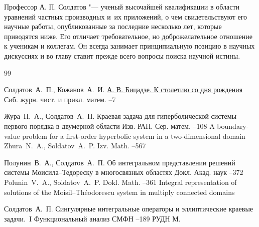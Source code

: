 Профессор А. П. Солдатов "--- ученый высочайшей квалификации в области уравнений частных производных и~их приложений, о чем свидетельствуют его научные работы, опубликованные за последние несколько лет, которые приводятся ниже. 
Его отличает требовательное, но доброжелательное отношение к ученикам и коллегам.
Он всегда занимает принципиальную позицию в научных дискуссиях и во главу ставит прежде всего вопросы поиска научной истины.




\newpage
\PersonRef

\begin{thebibliography}{99}

\by Солдатов~А.~П., Кожанов~А.~И.
\paper \href{http://mi.mathnet.ru/vngu441}{А. В. Бицадзе. К столетию со дня рождения}
\jour Сиб. журн. чист. и прикл. матем.
--7

\by Жура~Н.~А., Солдатов~А.~П.
\paper Краевая задача для гиперболической системы первого порядка в двумерной области
\jour Изв. РАН. Сер. матем.
--108
\transl
\paper A boundary-value problem for a first-order hyperbolic system in a two-dimensional domain
\by Zhura~N.~A.,  Soldatov~A.~P.
\jour Izv. Math.
--567


\by Полунин~В.~А., Солдатов~А.~П.
\paper Об интегральном представлении решений системы Моисила--Тедореску в многосвязных областях
\jour Докл. Акад. наук
–372
\transl
\by Polunin~V.~A.,  Soldatov~A.~P.
\jour Dokl. Math. 
–361 
\paper Integral representation of solutions of the Moisil–Théodorescu system in multiply connected domains


\by Солдатов~А.~П.
\paper Сингулярные интегральные операторы и эллиптические краевые задачи.~I
\inbook Функциональный анализ
\serial СМФН
--189
\publ РУДН
\publaddr М.


\end{thebibliography}
